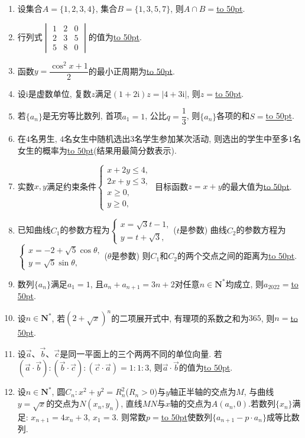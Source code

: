 \documentclass[10pt,a4paper]{article}
\newcommand{\blank}[1]{\underline{\hbox to #1pt{}}}
\begin{document}
\begin{enumerate}[1.]
\item 设集合$A=\{1,2,3,4\}$, 集合$B=\{1,3,5,7\}$, 则$A\cap B=$\blank{50}.
\item 行列式$\begin{vmatrix}1 & 2 & 0 \\2 & 3 & 5 \\5 & 8 & 0\end{vmatrix}$的值为\blank{50}.
\item 函数$y=\dfrac{\cos ^2x+1}2$的最小正周期为\blank{50}.
\item 设$\mathrm{i}$是虚数单位, 复数$z$满足$(1+2\mathrm{i})z=|4+3\mathrm{i}|$, 则$z=$\blank{50}.
\item 若$\{a_n\}$是无穷等比数列, 首项$a_1=1$, 公比$q=\dfrac 13$, 则$\{a_n\}$各项的和$S=$\blank{50}.
\item 在$4$名男生, $4$名女生中随机选出$3$名学生参加某次活动, 则选出的学生中至多$1$名女生的概率为\blank{50}(结果用最简分数表示).
\item 实数$x,y$满足约束条件$\begin{cases}x+2y\le 4, \\ 2x+y\le 3, \\ x\ge 0, \\ y\ge 0, \end{cases}$ 目标函数$z=x+y$的最大值为\blank{50}.
\item 已知曲线$C_1$的参数方程为$\begin{cases}
x=\sqrt 3t-1,  \\ y=t+\sqrt 3,  \end{cases}$($t$是参数) 曲线$C_2$的参数方程为$\begin{cases} x=-2+\sqrt 5\cos \theta,   \\ y=\sqrt 5\sin \theta,   \end{cases}$($\theta$是参数) 则$C_1$和$C_2$的两个交点之间的距离为\blank{50}.
\item 数列$\{a_n\}$满足$a_1=1$, 且$a_n+a_{n+1}=3n+2$对任意$n\in \mathbf{N}^*$均成立, 则$a_{2022}=$\blank{50}.
\item 设$n\in \mathbf{N}^*$, 若$(2+\sqrt x)^n$的二项展开式中, 有理项的系数之和为$365$, 则$n=$\blank{50}.
\item 设$\overrightarrow a$、$\overrightarrow b$、$\overrightarrow c$是同一平面上的三个两两不同的单位向量. 若$(\overrightarrow a\cdot \overrightarrow b):(\overrightarrow b\cdot \overrightarrow c):(\overrightarrow c\cdot \overrightarrow a)=1:1:3$, 则$\overrightarrow a\cdot\overrightarrow b$的值为\blank{50}.
\item 设$n\in \mathbf{N}^*$, 圆$C_n:x^2+y^2=R_n^2$($R_n>0$)与$y$轴正半轴的交点为$M$, 与曲线$y=\sqrt x$的交点为$N(x_n,y_n)$, 直线$MN$与$x$轴的交点为$A(a_n,0)$.若数列$\{x_n\}$满足: $x_{n+1}=4x_n+3$, $x_1=3$. 则常数$p=$\blank{50}使数列$\{a_{n+1}-p\cdot a_n\}$成等比数列.

\end{enumerate}
\end{document}
